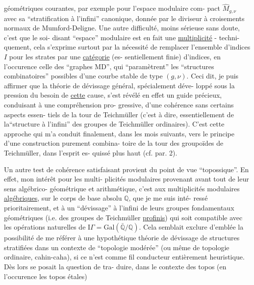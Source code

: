 
géométriques courantes, par exemple pour l'espace modulaire com-%
pact $\hat{M}_{g,\nu}$ avec sa ``stratification à l'infini'' canonique, donnée
par le diviseur à croisements normaux de Mumford-Deligne. Une
autre difficulté, moins sérieuse sans doute, c'est que le soi-%
disant ``espace'' modulaire est en fait une \uline{multiplicité} - techni-%
quement, cela s'exprime surtout par la nécessité de remplacer
l'ensemble d'indices $I$ pour les strates par une \uline{catégorie} (es-%
sentiellement finie) d'indices, en l'occurence celle des
``graphes MD'', qui ``paramètrent'' les ``structures combinatoires''
possibles d'une courbe stable de type $(g,\nu)$. Ceci dit, je puis
affirmer que la théorie de dévissage général, spécialement déve-%
loppé sous la pression du besoin de \uline{cette} cause, s'est révélé
en effet un guide précieux, conduisant à une compréhension pro-%
gressive, d'une cohérence sans  certains aspects essen-%
tiels de la tour de Teichmüller (c'est à dire, essentiellement
de la``structure à l'infini'' des groupes de Teichmüller ordinaires).
C'est cette approche qui m'a conduit finalement, dans les mois
suivants, vers le principe d'une construction purement combina-%
toire de la tour des groupoïdes de Teichmüller, dans l'esprit es-%
quissé plus haut (cf. par. 2).

Un autre test de cohérence satisfaisant provient du
point de vue ``topossique''. En effet, mon intérêt pour les multi-%
plicités modulaires provenant avant tout de leur sens algébrico-%
géométrique et arithmétique, c'est aux multiplicités modulaires
\uline{algébriques}, sur le corps de base absolu $\mathbb{Q}$, que je me suis inté-%
ressé prioritairement, et à un ``dévissage'' à l'infini de leurs
groupes fondamentaux géométriques (i.e. des groupes de Teichmüller
\uline{profinis}) qui soit compatible avec les opérations naturelles de
$\mathrm{I}\!\Gamma = \mathrm{Gal}(\bar{\mathbb{Q}}/\mathbb{Q})$. Cela semblait exclure d'emblée la possibilité de me
référer à une hypothétique théorie de dévissage de structures
stratifiées dans un contexte de ``topologie modérée'' (ou même de
topologie ordinaire, cahin-caha), si ce n'est comme fil conducteur
entièrement heuristique. Dès lors se posait la question de tra-%
duire, dans le contexte des topos (en l'occurence les topos étales)


